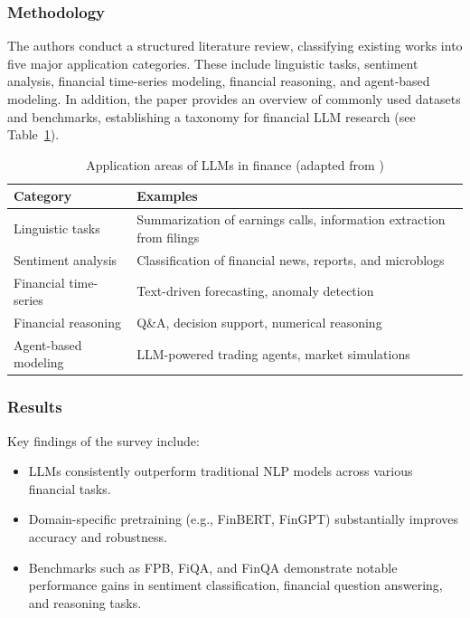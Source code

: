 \documentclass[12pt,a4paper]{report}
\begin{document}
\subsubsection{Methodology}
The authors conduct a structured literature review, classifying existing works into five major application categories. These include linguistic tasks, sentiment analysis, financial time-series modeling, financial reasoning, and agent-based modeling. In addition, the paper provides an overview of commonly used datasets and benchmarks, establishing a taxonomy for financial LLM research (see Table~\ref{tab:finance-llm-taxonomy}).

\begin{table}[h]
\centering
\caption{Application areas of LLMs in finance (adapted from \cite{nie2024survey})}
\begin{tabular}{p{3.5cm} p{9cm}}
\toprule
\textbf{Category} & \textbf{Examples} \\
\midrule
Linguistic tasks & Summarization of earnings calls, information extraction from filings \\
Sentiment analysis & Classification of financial news, reports, and microblogs \\
Financial time-series & Text-driven forecasting, anomaly detection \\
Financial reasoning & Q\&A, decision support, numerical reasoning \\
Agent-based modeling & LLM-powered trading agents, market simulations \\
\bottomrule
\end{tabular}
\label{tab:finance-llm-taxonomy}
\end{table}

\subsubsection{Results}
Key findings of the survey include:
\begin{itemize}
    \item LLMs consistently outperform traditional NLP models across various financial tasks.
    \item Domain-specific pretraining (e.g., FinBERT, FinGPT) substantially improves accuracy and robustness.
    \item Benchmarks such as FPB, FiQA, and FinQA demonstrate notable performance gains in sentiment classification, financial question answering, and reasoning tasks.
\end{itemize}
\end{document}
